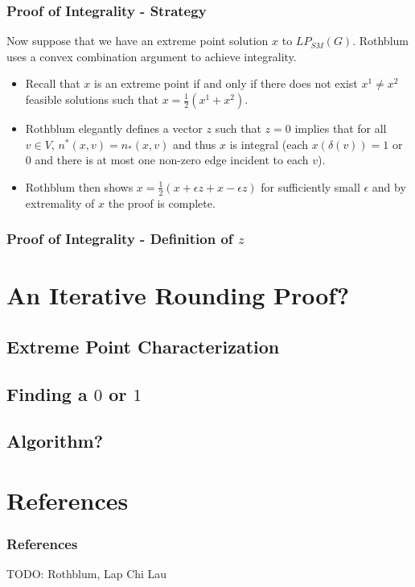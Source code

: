 \documentclass{beamer}
\begin{document}
\begin{frame}
\frametitle{Proof of Integrality - Strategy}
Now suppose that we have an extreme point solution $x$ to $LP_{SM}(G)$. Rothblum uses a convex combination argument to achieve integrality. 
\begin{itemize}
\item Recall that $x$ is an extreme point if and only if there does not exist $x^1 \neq x^2$ feasible solutions such that $x = \frac{1}{2}(x^1 + x^2)$.
\item Rothblum elegantly defines a vector $z$ such that $z = 0$ implies that for all $v \in V$, $n^*(x,v) = n_*(x,v)$ and thus $x$ is integral (each $x(\delta(v)) = 1$ or $0$ and there is at most one non-zero edge incident to each $v$).
\item Rothblum then shows $x = \frac{1}{2}(x + \epsilon z  + x - \epsilon z)$ for sufficiently small $\epsilon$ and by extremality of $x$ the proof is complete.
\end{itemize}
\end{frame}

\begin{frame}
\frametitle{Proof of Integrality - Definition of $z$}
\end{frame}

\section{An Iterative Rounding Proof?}
\subsection{Extreme Point Characterization}
\subsection{Finding a $0$ or $1$}
\subsection{Algorithm?}
\section{References}
\begin{frame}
\frametitle{References}
TODO: Rothblum, Lap Chi Lau
\end{frame}
\end{document}
